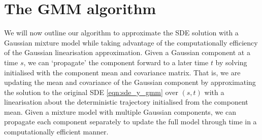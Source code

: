 \section{The GMM algorithm}\label{sec:gmm_alg}
We will now outline our algorithm to approximate the SDE solution with a Gaussian mixture model while taking advantage of the computationally efficiency of the Gaussian linearisation approximation.
Given a Gaussian component at a time \(s\), we can `propagate' the component forward to a later time \(t\) by solving  initialised with the component mean and covariance matrix.
That is, we are updating the mean and covariance of the Gaussian component by approximating the solution to the original SDE \cref{eqn:sde_y_gmm} over \((s,t)\) with a linearisation about the deterministic trajectory initialised from the component mean.
Given a mixture model with multiple Gaussian components, we can propagate each component separately to update the full model through time in a computationally efficient manner.


